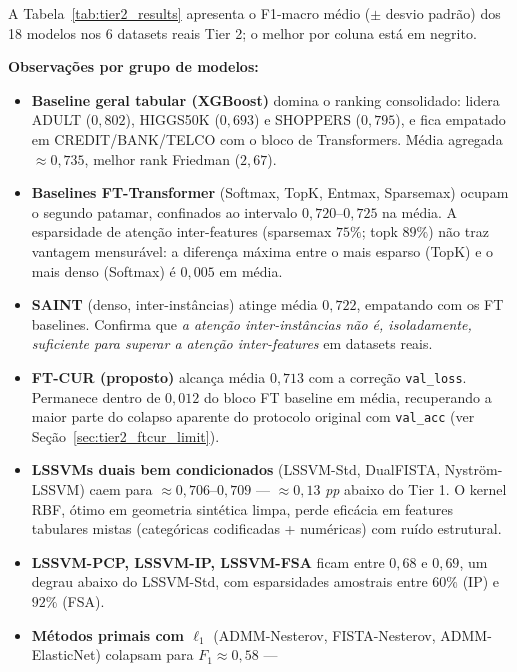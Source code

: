 \documentclass[12pt,a4paper]{article}
\begin{document}
A Tabela~\ref{tab:tier2_results} apresenta o F1-macro médio ($\pm$ desvio
padrão) dos 18 modelos nos 6 datasets reais Tier 2; o melhor por coluna está
em negrito.



\textbf{Observações por grupo de modelos:}
\begin{itemize}
  \item \textbf{Baseline geral tabular (XGBoost)} domina o ranking
        consolidado: lidera ADULT (\(0{,}802\)), HIGGS50K (\(0{,}693\)) e
        SHOPPERS (\(0{,}795\)), e fica empatado em CREDIT/BANK/TELCO com o
        bloco de Transformers. Média agregada $\approx 0{,}735$, melhor
        rank Friedman (\(2{,}67\)).
  \item \textbf{Baselines FT-Transformer} (Softmax, TopK, Entmax, Sparsemax)
        ocupam o segundo patamar, confinados ao intervalo
        \(0{,}720\)--\(0{,}725\) na média. A esparsidade de atenção
        inter-features (sparsemax \(75\%\); topk \(89\%\)) não traz vantagem
        mensurável: a diferença máxima entre o mais esparso (TopK) e o mais
        denso (Softmax) é $0{,}005$ em média.
  \item \textbf{SAINT} (denso, inter-instâncias) atinge média \(0{,}722\),
        empatando com os FT baselines. Confirma que \emph{a atenção
        inter-instâncias não é, isoladamente, suficiente para superar a
        atenção inter-features} em datasets reais.
  \item \textbf{FT-CUR (proposto)} alcança média \(0{,}713\) com a correção
        \texttt{val\_loss}. Permanece dentro de $0{,}012$ do bloco FT baseline
        em média, recuperando a maior parte do colapso aparente do protocolo
        original com \texttt{val\_acc} (ver Seção~\ref{sec:tier2_ftcur_limit}).
  \item \textbf{LSSVMs duais bem condicionados} (LSSVM-Std, DualFISTA,
        Nyström-LSSVM) caem para $\approx 0{,}706$--$0{,}709$ ---
        $\approx 0{,}13$ \emph{pp} abaixo do Tier 1. O kernel RBF, ótimo em
        geometria sintética limpa, perde eficácia em features tabulares mistas
        (categóricas codificadas + numéricas) com ruído estrutural.
  \item \textbf{LSSVM-PCP, LSSVM-IP, LSSVM-FSA} ficam entre $0{,}68$ e
        $0{,}69$, um degrau abaixo do LSSVM-Std, com esparsidades amostrais
        entre $60\%$ (IP) e $92\%$ (FSA).
  \item \textbf{Métodos primais com $\ell_1$} (ADMM-Nesterov, FISTA-Nesterov,
        ADMM-ElasticNet) colapsam para $F_1 \approx 0{,}58$ ---

\end{itemize}
\end{document}
